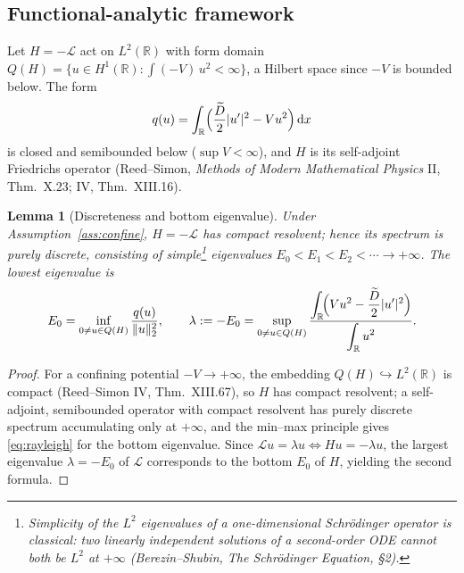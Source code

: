\documentclass{amsart}
\newtheorem{lemma}{Lemma}
\theoremstyle{definition}
\newcommand{\R}{\mathbb{R}}
\newcommand{\dd}{\,\mathrm{d}}
\begin{document}
\subsection*{Functional-analytic framework}
Let $H=-\mathcal L$ act on $L^2(\R)$ with form domain
$Q(H)=\{u\in H^1(\R): \int (-V)\,u^2<\infty\}$, a Hilbert space since $-V$ is bounded below.
The form
\begin{equation}\label{eq:form}
q(u)=\int_\R\Bigl(\frac{\widetilde D}{2}|u'|^2 - V u^2\Bigr)\dd x
\end{equation}
is closed and semibounded below ($\sup V<\infty$), and $H$ is its self-adjoint Friedrichs
operator (Reed--Simon, \emph{Methods of Modern Mathematical Physics} II, Thm.~X.23; IV,
Thm.~XIII.16).

\begin{lemma}[Discreteness and bottom eigenvalue]\label{lem:discrete}
Under Assumption~\ref{ass:confine}, $H=-\mathcal L$ has compact resolvent; hence its spectrum
is purely discrete, consisting of simple\footnote{Simplicity of the $L^2$ eigenvalues of a
one-dimensional Schr\"odinger operator is classical: two linearly independent solutions of a
second-order ODE cannot both be $L^2$ at $+\infty$ (Berezin--Shubin, \emph{The Schr\"odinger
Equation}, \S2).} eigenvalues $E_0<E_1<E_2<\cdots\to+\infty$. The lowest eigenvalue is
\begin{equation}\label{eq:rayleigh}
E_0=\inf_{0\neq u\in Q(H)}\frac{q(u)}{\|u\|_{2}^2},\qquad
\lambda:=-E_0=\sup_{0\neq u\in Q(H)}\frac{\displaystyle\int_\R\!\Bigl(V u^2-\frac{\widetilde D}{2}|u'|^2\Bigr)}{\displaystyle\int_\R u^2}.
\end{equation}
\end{lemma}

\begin{proof}
For a confining potential $-V\to+\infty$, the embedding $Q(H)\hookrightarrow L^2(\R)$ is
compact (Reed--Simon IV, Thm.~XIII.67), so $H$ has compact resolvent; a self-adjoint,
semibounded operator with compact resolvent has purely discrete spectrum accumulating only at
$+\infty$, and the min--max principle gives \eqref{eq:rayleigh} for the bottom eigenvalue.
Since $\mathcal L u=\lambda u\iff Hu=-\lambda u$, the largest eigenvalue $\lambda=-E_0$ of
$\mathcal L$ corresponds to the bottom $E_0$ of $H$, yielding the second formula.
\end{proof}
\end{document}
